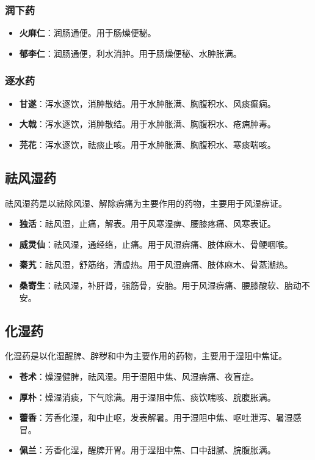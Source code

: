 \documentclass[12pt,UTF8]{ctexbook}
\begin{document}
\subsubsection{润下药}

\begin{itemize}
\item \textbf{火麻仁}：润肠通便。用于肠燥便秘。
\item \textbf{郁李仁}：润肠通便，利水消肿。用于肠燥便秘、水肿胀满。
\end{itemize}

\subsubsection{逐水药}

\begin{itemize}
\item \textbf{甘遂}：泻水逐饮，消肿散结。用于水肿胀满、胸腹积水、风痰癫痫。
\item \textbf{大戟}：泻水逐饮，消肿散结。用于水肿胀满、胸腹积水、疮痈肿毒。
\item \textbf{芫花}：泻水逐饮，祛痰止咳。用于水肿胀满、胸腹积水、寒痰喘咳。
\end{itemize}

\subsection{祛风湿药}

祛风湿药是以祛除风湿、解除痹痛为主要作用的药物，主要用于风湿痹证。

\begin{itemize}
\item \textbf{独活}：祛风湿，止痛，解表。用于风寒湿痹、腰膝疼痛、风寒表证。
\item \textbf{威灵仙}：祛风湿，通经络，止痛。用于风湿痹痛、肢体麻木、骨鲠咽喉。
\item \textbf{秦艽}：祛风湿，舒筋络，清虚热。用于风湿痹痛、肢体麻木、骨蒸潮热。
\item \textbf{桑寄生}：祛风湿，补肝肾，强筋骨，安胎。用于风湿痹痛、腰膝酸软、胎动不安。
\end{itemize}

\subsection{化湿药}

化湿药是以化湿醒脾、辟秽和中为主要作用的药物，主要用于湿阻中焦证。

\begin{itemize}
\item \textbf{苍术}：燥湿健脾，祛风湿。用于湿阻中焦、风湿痹痛、夜盲症。
\item \textbf{厚朴}：燥湿消痰，下气除满。用于湿阻中焦、痰饮喘咳、脘腹胀满。
\item \textbf{藿香}：芳香化湿，和中止呕，发表解暑。用于湿阻中焦、呕吐泄泻、暑湿感冒。
\item \textbf{佩兰}：芳香化湿，醒脾开胃。用于湿阻中焦、口中甜腻、脘腹胀满。
\end{itemize}
\end{document}
